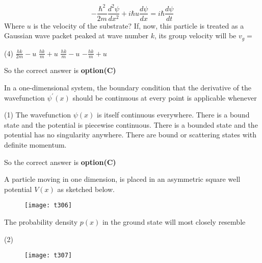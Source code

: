 \begin{questions}
\begin{minipage}{\textwidth}
	$$
	-\frac{\hbar^{2}}{2 m} \frac{d^{2} \psi}{d x^{2}}+i \hbar u \frac{d \psi}{d x}=i \hbar \frac{d \psi}{d t}
	$$
	Where $u$ is the velocity of the substrate? If, now, this particle is treated as a Gaussian wave packet peaked at wave number $k$, its group velocity will be $v_{g}=$
\end{minipage}
\begin{tasks}(4)
	\task[\textbf{A.}] $\frac{h k}{2 m}-u$
	\task[\textbf{B.}]   $\frac{h k}{m}+u$
	\task[\textbf{C.}] $\frac{h k}{m}-u$
	\task[\textbf{D.}]   $-\frac{h k}{m}+u$
\end{tasks}
\begin{answer}
	So the correct answer is \textbf{option(C)}
\end{answer}
\begin{minipage}{\textwidth}
	\question In a one-dimensional system, the boundary condition that the derivative of the wavefunction $\psi^{\prime}(x)$ should be continuous at every point is applicable whenever
\end{minipage}
\begin{tasks}(1)
	\task[\textbf{A.}] The wavefunction $\psi(x)$ is itself continuous everywhere.
	\task[\textbf{B.}] There is a bound state and the potential is piecewise continuous.
	\task[\textbf{C.}] There is a bounded state and the potential has no singularity anywhere.
	\task[\textbf{D.}]   There are bound or scattering states with definite momentum.
\end{tasks}
\begin{answer}
	So the correct answer is \textbf{option(C)}
\end{answer}
\begin{minipage}{\textwidth}
	\question A particle moving in one dimension, is placed in an asymmetric square well potential $V(x)$ as sketched below.\\
	\begin{figure}[H]
		\centering
		\texttt{[image: t306]}
	\end{figure}
	The probability density $p(x)$ in the ground state will most closely resemble
\end{minipage}
\begin{tasks}(2)
	\task[\textbf{A.}] \begin{figure}[H]
		\centering
		\texttt{[image: t307]}
	\end{figure}
	\task[\textbf{B.}] \begin{figure}[H]

\end{figure}
\end{tasks}
\end{questions}
